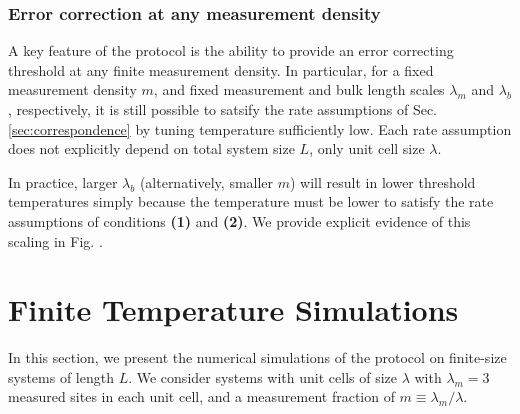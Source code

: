 \documentclass[twocolumn,superscriptaddress,aps,prb,floatfix]{revtex4-1}
\begin{document}
 \subsubsection{Error correction at any measurement density}
 \label{sec:ecc_any_m}
 
 A key feature of the protocol is the ability to provide an error correcting threshold at any finite measurement density.  In particular, for a fixed measurement density $m$, and fixed measurement and bulk length scales $\lambda_m$ and $\lambda_b$, respectively, it is still possible to satsify the rate assumptions of Sec. \ref{sec:correspondence} by tuning temperature sufficiently low.  Each rate assumption does not explicitly depend on total system size $L$, only unit cell size $\lambda$.
 
 In practice, larger $\lambda_b$ (alternatively, smaller $m$) will result in lower threshold temperatures simply because the temperature must be lower to satisfy the rate assumptions of conditions \textbf{(1)} and \textbf{(2)}.  We provide explicit evidence of this scaling in Fig. \label{fig:CriticalTempVsMeasurementFraction}.
 

 
\section{Finite Temperature Simulations}
\label{sec:experiments}

In this section, we present the numerical simulations of the protocol on finite-size systems of length $L$. We consider systems with unit cells of size $\lambda$ with $\lambda_m=3$ measured sites in each unit cell, and a measurement fraction of $m\equiv \lambda_m/\lambda$.
\end{document}
